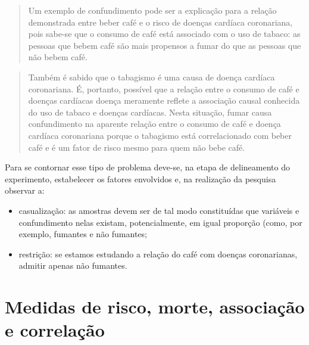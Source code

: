 \documentclass[
]{book}
\providecommand{\tightlist}{%
  \setlength{\itemsep}{0pt}\setlength{\parskip}{0pt}}
\begin{document}
\begin{quote}
Um exemplo de confundimento pode ser a explicação para a relação demonstrada entre beber café e o risco de doenças cardíaca coronariana, pois sabe-se que o consumo de café está associado com o uso de tabaco: as pessoas que bebem café são mais propensos a fumar do que as pessoas que não bebem café.
\end{quote}

\hfill\break

\begin{quote}
Também é sabido que o tabagismo é uma causa de doença cardíaca coronariana. É, portanto, possível que a relação entre o consumo de café e doenças cardíacas doença meramente reflete a associação causal conhecida do uso de tabaco e doenças cardíacas. Nesta situação, fumar causa confundimento na aparente relação entre o consumo de café e doença cardíaca coronariana porque o tabagismo está correlacionado com beber café e é um fator de risco mesmo para quem não bebe café.
\end{quote}

\hfill\break

Para se contornar esse tipo de problema deve-se, na etapa de delineamento do experimento, estabelecer os fatores envolvidos e, na realização da pesquisa observar a:

\hfill\break

\begin{itemize}
\tightlist
\item
  casualização: as amostras devem ser de tal modo constituídas que variáveis e confundimento nelas existam, potencialmente, em igual proporção (como, por exemplo, fumantes e não fumantes;\\
\item
  restrição: se estamos estudando a relação do café com doenças coronarianas, admitir apenas não fumantes.
\end{itemize}

\hfill\break

\hypertarget{medidas-de-risco-morte-associauxe7uxe3o-e-correlauxe7uxe3o}{%
\section{Medidas de risco, morte, associação e correlação}\label{medidas-de-risco-morte-associauxe7uxe3o-e-correlauxe7uxe3o}}

\hfill\break
\end{document}
